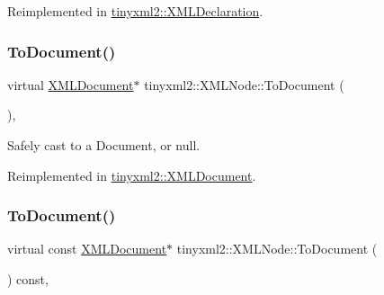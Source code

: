 Reimplemented in \mbox{\hyperlink{classtinyxml2_1_1_x_m_l_declaration_aa20c3315b18c3b88830dccf5c493259b}{tinyxml2\+::\+X\+M\+L\+Declaration}}.

\mbox{\label{classtinyxml2_1_1_x_m_l_node_a836e2966ed736fc3c94f70e12a2a3357}} 
\subsubsection{\texorpdfstring{To\+Document()}{ToDocument()}\hspace{0.1cm}{\footnotesize\ttfamily [1/2]}}
{\footnotesize\ttfamily virtual \mbox{\hyperlink{classtinyxml2_1_1_x_m_l_document}{X\+M\+L\+Document}}$\ast$ tinyxml2\+::\+X\+M\+L\+Node\+::\+To\+Document (\begin{DoxyParamCaption}{ }\end{DoxyParamCaption})\hspace{0.3cm}{\ttfamily [inline]}, {\ttfamily [virtual]}}



Safely cast to a Document, or null. 



Reimplemented in \mbox{\hyperlink{classtinyxml2_1_1_x_m_l_document_a3e185f880882bd978367bb55937735ec}{tinyxml2\+::\+X\+M\+L\+Document}}.

\mbox{\label{classtinyxml2_1_1_x_m_l_node_ae8a5250331a5f12e10843fcb5ef3ef0b}} 
\subsubsection{\texorpdfstring{To\+Document()}{ToDocument()}\hspace{0.1cm}{\footnotesize\ttfamily [2/2]}}
{\footnotesize\ttfamily virtual const \mbox{\hyperlink{classtinyxml2_1_1_x_m_l_document}{X\+M\+L\+Document}}$\ast$ tinyxml2\+::\+X\+M\+L\+Node\+::\+To\+Document (\begin{DoxyParamCaption}{ }\end{DoxyParamCaption}) const\hspace{0.3cm}{\ttfamily [inline]}, {\ttfamily [virtual]}}



